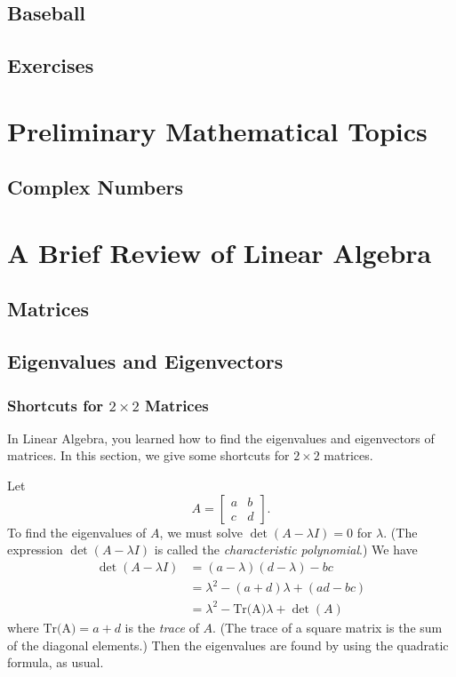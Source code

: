 \documentclass{book}
\begin{document}
\section{Baseball}
\section{Exercises}
%
\appendix
%
\chapter{Preliminary Mathematical Topics}
\section{Complex Numbers}
%
\chapter{A Brief Review of Linear Algebra}
\section{Matrices}
\section{Eigenvalues and Eigenvectors}
\subsection{Shortcuts for $2\times 2$ Matrices}
In Linear Algebra, you learned how to find the eigenvalues
and eigenvectors of matrices.  In this section, we give
some shortcuts for $2\times 2$ matrices.

Let
\[
   A = \begin{bmatrix}
              a & b \\ c & d
       \end{bmatrix}.
\]
To find the eigenvalues of $A$, we must solve
$\det(A-\lambda I)=0$ for $\lambda$.
(The expression $\det(A-\lambda I)$ is called
the \emph{characteristic polynomial}.)  We have
\[
\begin{split}
   \det(A-\lambda I) & = (a-\lambda)(d-\lambda)-bc \\
                     & = \lambda^2-(a+d)\lambda + (ad-bc) \\
		     & = \lambda^2 - \textrm{Tr(A)}\lambda + \det(A)
\end{split}
\]
where $\textrm{Tr(A)} = a+d$ is the \emph{trace} of $A$.
(The trace of a square matrix is the sum of the diagonal elements.)
Then the eigenvalues are found by using the quadratic
formula, as usual.
\end{document}
